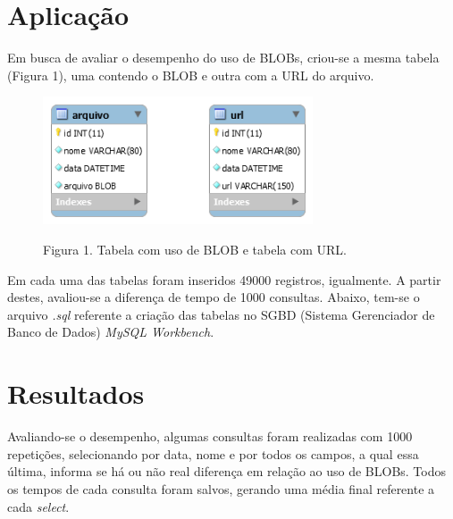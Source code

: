 \documentclass[12pt,a4paper]{article}
\begin{document}
\section{Aplicação}
Em busca de avaliar o desempenho do uso de BLOBs, criou-se a mesma tabela (Figura 1), uma contendo o BLOB e outra com a URL do arquivo.

\begin{figure}[htb]
	\label{figura:tabelas}
	\centering
	\includegraphics[width=8cm]{recursos/imagens/tabelas.png} 
	
	Figura 1. Tabela com uso de BLOB e tabela com URL.
\end{figure}

Em cada uma das tabelas foram inseridos 49000 registros, igualmente. A partir destes, avaliou-se a diferença de tempo de 1000 consultas. Abaixo, tem-se o arquivo \textit{.sql} referente a criação das tabelas no SGBD (Sistema Gerenciador de Banco de Dados) \textit{MySQL Workbench}. \\\vspace{0.1cm}



\section{Resultados}

Avaliando-se o desempenho, algumas consultas foram realizadas com 1000 repetições, selecionando por data, nome e por todos os campos, a qual essa última, informa se há ou não real diferença em relação ao uso de BLOBs. Todos os tempos de cada consulta foram salvos, gerando uma média final referente a cada \textit{select}. \\\vspace{0.1cm}






\end{document}
